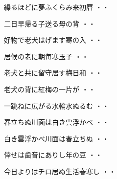 \vspace{0.6cm}
\begin{shiika}繰るほどに夢ふくらみ来初暦
\hfill{・・}\end{shiika}
\vspace{0.6cm}
\begin{shiika}二日早帰る子送る母の背
\hfill{・・}\end{shiika}
\vspace{0.6cm}
\begin{shiika}好物で老犬はげます寒の入
\hfill{・・}\end{shiika}
\vspace{0.6cm}
\begin{shiika}居候の老に朝毎寒玉子
\hfill{・・}\end{shiika}
\vspace{0.6cm}
\begin{shiika}老犬と共に留守居す梅日和
\hfill{・・}\end{shiika}
\vspace{0.6cm}
\begin{shiika}老犬の背に紅梅の一片が
\hfill{・・}\end{shiika}
\vspace{0.6cm}
\begin{shiika}一跳ねに広がる水輪水ぬるむ
\hfill{・・}\end{shiika}
\vspace{0.6cm}
\begin{shiika}春立ちぬ川面は白き雲浮かべ
\hfill{・・}\end{shiika}
\vspace{0.6cm}
\begin{shiika}白き雲浮かべ川面は春立ちぬ
\hfill{・・}\end{shiika}
\vspace{0.6cm}
\begin{shiika}倖せは歯音にありし年の豆
\hfill{・・}\end{shiika}
\vspace{0.6cm}
\begin{shiika}今日よりはチロ居ぬ生活春寒し
\hfill{・・}\end{shiika}
\vspace{0.6cm}

